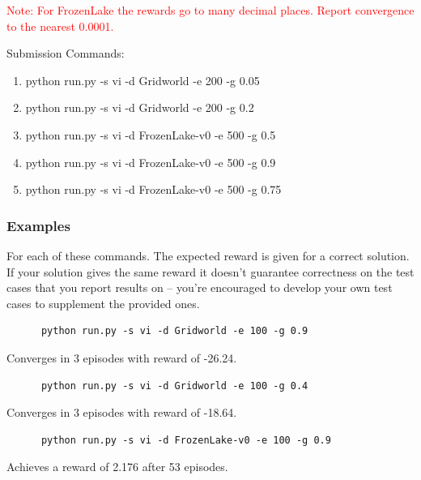 \documentclass[a4paper]{article}
\theoremstyle{definition}
\newcommand{\red}[1]{\textcolor{red}{#1}}
\begin{document}
\red{Note: For FrozenLake the rewards go to many decimal places. Report convergence to the nearest 0.0001.}

\vspace{8mm}

Submission Commands:
\begin{enumerate} 
    \item   python run.py -s vi -d Gridworld -e 200 -g 0.05
    \item   python run.py -s vi -d Gridworld -e 200 -g 0.2
    \item  python run.py -s vi -d FrozenLake-v0 -e 500 -g 0.5   
    \item  python run.py -s vi -d FrozenLake-v0 -e 500 -g 0.9  
    \item python run.py -s vi -d FrozenLake-v0 -e 500 -g 0.75 
\end{enumerate}


\subsubsection*{Examples}

For each of these commands. The expected reward is given for a correct solution. 
If your solution gives the same reward it doesn't guarantee correctness on the test cases that you report results on -- you're encouraged to develop your own test cases to supplement the provided ones.

\begin{verbatim}
      python run.py -s vi -d Gridworld -e 100 -g 0.9  
\end{verbatim}
Converges in 3 episodes with reward of -26.24.

\begin{verbatim}
      python run.py -s vi -d Gridworld -e 100 -g 0.4  
\end{verbatim}
Converges in 3 episodes with reward of -18.64.

\begin{verbatim}
      python run.py -s vi -d FrozenLake-v0 -e 100 -g 0.9  
\end{verbatim}
Achieves a reward of 2.176 after 53 episodes.
\end{document}
